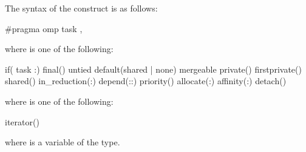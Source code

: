 \syntax
\begin{ccppspecific}
\begin{samepage}
The syntax of the  construct is as follows:

\begin{ompcPragma}
#pragma omp task \plc{[clause[ [},\plc{] clause] ... ] new-line}
\end{ompcPragma}
\end{samepage}

\begin{samepage}
where  is one of the following{}:

\begin{indentedcodelist}
if(\plc{[} task :\plc{] scalar-expression})
final()
untied
default(shared \textnormal{|} none)
mergeable
private()
firstprivate()
shared()
in_reduction(:)
depend(\plc{[depend-modifier}:\plc{][dependence-type }:\plc{] locator-list})
priority()
allocate(\plc{[allocator }:\plc{] list})
affinity(\plc{[aff-modifier }:\plc{] locator-list})
detach()
\end{indentedcodelist}

where  is one of the following{}:
\begin{indentedcodelist}
iterator() 
\end{indentedcodelist}

where  is a variable of the  type.

\end{samepage}
\end{ccppspecific}

